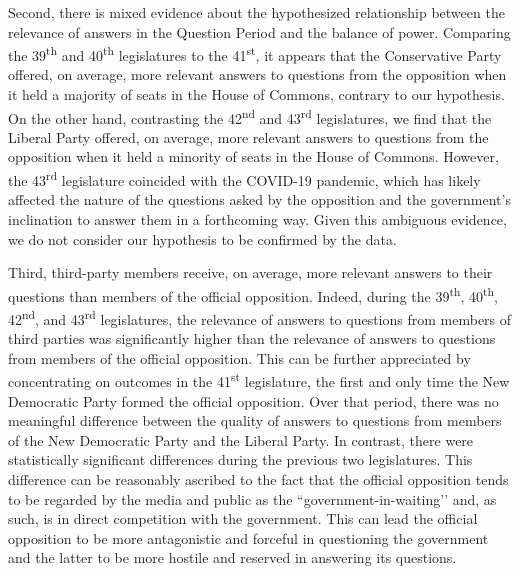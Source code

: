 {{Second, there is mixed evidence about the hypothesized relationship between the relevance of answers in the Question Period and the balance of power. Comparing the 39\textsuperscript{th} and 40\textsuperscript{th} legislatures to the 41\textsuperscript{st}, it appears that the Conservative Party offered, on average, more relevant answers to questions from the opposition when it held a majority of seats in the House of Commons, contrary to our hypothesis. On the other hand, contrasting the 42\textsuperscript{nd} and 43\textsuperscript{rd} legislatures, we find that the Liberal Party offered, on average, more relevant answers to questions from the opposition when it held a minority of seats in the House of Commons. However, the 43\textsuperscript{rd} legislature coincided with the COVID-19 pandemic, which has likely affected the nature of the questions asked by the opposition and the government’s inclination to answer them in a forthcoming way. Given this ambiguous evidence, we do not consider our hypothesis to be confirmed by the data.

Third, third-party members receive, on average, more relevant answers to their questions than members of the official opposition. Indeed, during the 39\textsuperscript{th}, 40\textsuperscript{th}, 42\textsuperscript{nd}, and 43\textsuperscript{rd} legislatures, the relevance of answers to questions from members of third parties was significantly higher than the relevance of answers to questions from members of the official opposition. This can be further appreciated by concentrating on outcomes in the 41\textsuperscript{st} legislature, the first and only time the New Democratic Party formed the official opposition. Over that period, there was no meaningful difference between the quality of answers to questions from members of the New Democratic Party and the Liberal Party. In contrast, there were statistically significant differences during the previous two legislatures. This difference can be reasonably ascribed to the fact that the official opposition tends to be regarded by the media and public as the ``government-in-waiting’’ and, as such, is in direct competition with the government. This can lead the official opposition to be more antagonistic and forceful in questioning the government and the latter to be more hostile and reserved in answering its questions.

}}
